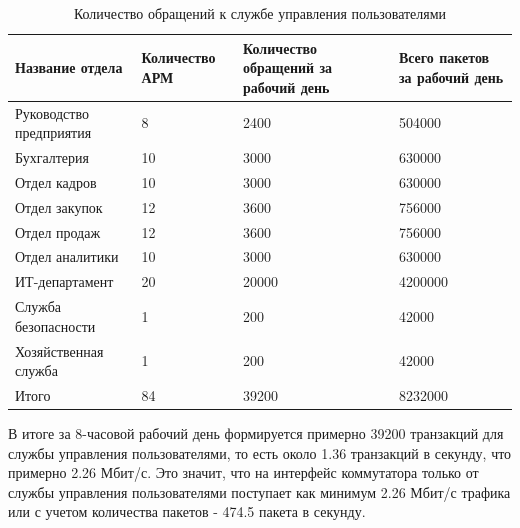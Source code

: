 \begin{table}[H]
\centering
{}
\caption{Количество обращений к службе управления пользователями\;\label{table:IPA_usage}}
\small
\begin{tabularx}{\textwidth}{|X|X|X|X|}
\hline
	Название отдела	&	Количество АРМ	&	Количество обращений за рабочий день	&	Всего пакетов за рабочий день \\ \hline
		Руководство предприятия         & 8       		&  	2400				&	504000  \\
		\hline
		Бухгалтерия						& 10         	&  	3000				&	630000  \\
        \hline
		Отдел кадров					& 10         	&  	3000				&	630000  \\
        \hline
		Отдел закупок					& 12         	&  	3600				&	756000  \\
        \hline
		Отдел продаж					& 12         	&  	3600				&	756000  \\
        \hline
		Отдел аналитики					& 10         	&  	3000				&	630000  \\
        \hline
		ИТ-департамент					& 20         	&  	20000				&	4200000  \\
		\hline
		Служба безопасности				& 1				& 	200					&	42000	  \\
        \hline
		Хозяйственная служба			& 1         	&  	200					&	42000  \\
        \hline
		Итого							& 84			&	39200				& 	8232000 \\  
		\hline
\end{tabularx}
\end{table}


В итоге за 8-часовой рабочий день формируется примерно 39200 транзакций для службы управления пользователями, то есть около 1.36 транзакций в секунду, что примерно 2.26 Мбит/с. Это значит, что на интерфейс коммутатора только от службы управления пользователями поступает как минимум 2.26 Мбит/с трафика или с учетом количества пакетов - 474.5 пакета в секунду. 

